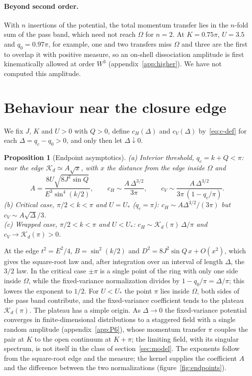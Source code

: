 \documentclass[12pt,a4paper]{article}
\newtheorem{proposition}{Proposition}
\theoremstyle{remark}
\newcommand{\Kd}{\mathcal{K}_d}
\newcommand{\Ustar}{U_{*}}
\begin{document}
\paragraph{Beyond second order.} With $n$ insertions of the potential, the total momentum transfer lies in the $n$-fold sum of the pass band, which need not reach $\Omega$ for $n=2$. At $K=0.75\pi$, $U=3.5$ and $q_0=0.97\pi$, for example, one and two transfers miss $\Omega$ and three are the first to overlap it with positive measure, so an on-shell dissociation amplitude is first kinematically allowed at order $W^3$ (appendix~\ref{app:higher}). We have not computed this amplitude.

\section{Behaviour near the closure edge}\label{sec:endpoints}

We fix $J$, $K$ and $U>0$ with $Q>0$, define $c_H(\Delta)$ and $c_V(\Delta)$ by~\eqref{eq:c-def} for each $\Delta=q_c-q_0>0$, and only then let $\Delta\downarrow0$.

\begin{proposition}[Endpoint asymptotics]\label{prop:endpoints}
(a) Interior threshold, $q_c=k+Q<\pi$: near the edge $\Kd\simeq A\sqrt{x}$, with $x$ the distance from the edge inside $\Omega$ and
\begin{equation}\label{eq:A}
A=\frac{8U\sqrt{8J^2\sin Q}}{E^3\sin^4(k/2)},\qquad
c_H\sim\frac{A\,\Delta^{3/2}}{3\pi},\qquad c_V\sim\frac{A\,\Delta^{3/2}}{3\pi\,(1-q_c/\pi)} .
\end{equation}
(b) Critical case, $\pi/2<k<\pi$ and $U=\Ustar$ ($q_c=\pi$): $c_H\sim A\Delta^{3/2}/(3\pi)$ but $c_V\sim A\sqrt{\Delta}/3$.\\
(c) Wrapped case, $\pi/2<k<\pi$ and $U<\Ustar$: $c_H\sim\Kd(\pi)\,\Delta/\pi$ and $c_V\to\Kd(\pi)>0$.
\end{proposition}

At the edge $t^2=E^2/4$, $B=\sin^2(k/2)$ and $D^2=8J^2\sin Q\,x+O(x^2)$, which gives the square-root law and, after integration over an interval of length $\Delta$, the $3/2$ law. In the critical case $\pm\pi$ is a single point of the ring with only one side inside $\Omega$, while the fixed-variance normalization divides by $1-q_0/\pi=\Delta/\pi$; this lowers the exponent to $1/2$. For $U<\Ustar$ the point $\pi$ lies inside $\Omega$, both sides of the pass band contribute, and the fixed-variance coefficient tends to the plateau $\Kd(\pi)$. The plateau has a simple origin. As $\Delta\to0$ the fixed-variance potential converges in finite-dimensional distributions to a staggered field with a single random amplitude (appendix~\ref{app:P6}), whose momentum transfer $\pi$ couples the pair at $K$ to the open continuum at $K+\pi$; the limiting field, with its singular spectrum, is not itself in the class of section~\ref{sec:model}. The exponents follow from the square-root edge and the measure; the kernel supplies the coefficient $A$ and the difference between the two normalizations (figure~\ref{fig:endpoints}).
\end{document}
